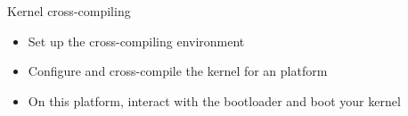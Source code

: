 \setuplabframe
{Kernel cross-compiling}
{
  \begin{itemize}
  \item Set up the cross-compiling environment
  \item Configure and cross-compile the kernel for an 
    platform
  \item On this platform, interact with the bootloader and boot your
    kernel
  \end{itemize}
}
